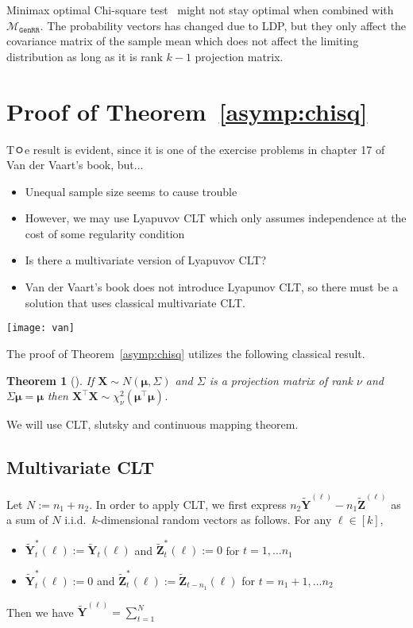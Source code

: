 \documentclass[11pt]{article} %
\newcommand{\vecBold}[1]{\boldsymbol{#1}} %
\newcommand{\alphabetSize}{k}
\newcommand{\genrr}{\mathcal{M}_{\texttt{GenRR}}}
\newcommand{\rvY}{Y}
\newcommand{\rVecY}{\vecBold{\rvY}}
\newcommand{\rvZ}{Z}
\newcommand{\rVecZ}{\vecBold{\rvZ}}
\newtheorem{theorem}{Theorem}[section]
\begin{document}
Minimax optimal Chi-square test~\citet{Arias-Castro2018RememberDimension} might not stay optimal when combined with $\genrr$.
The probability vectors has changed due to LDP, but they only affect the covariance matrix of the sample mean which does not affect the limiting distribution as long as it is rank $\alphabetSize-1$ projection matrix.

\section{Proof of Theorem~\ref{asymp:chisq} }

Tㅇe result is evident, since it is one of the exercise problems in chapter 17 of Van der Vaart's book, but...
\begin{itemize}
	\item Unequal sample size seems to cause trouble
	\item However, we may use Lyapuvov CLT which only assumes independence at the cost of some regularity condition
	\item Is there a multivariate version of Lyapuvov CLT?
	\item Van der Vaart's book does not introduce Lyapunov CLT, so there must be a solution that uses classical multivariate CLT. 
\end{itemize}
\begin{figure*}
	\texttt{[image: van]}
\end{figure*}
The proof of Theorem~\ref{asymp:chisq}  utilizes the following classical result.
\begin{theorem}[\citet{ferguson1996course}]
	If $\boldsymbol{X} \sim N(\boldsymbol{\mu}, \Sigma)$
	and
	$\Sigma$ is a projection matrix of rank $\nu$ and $\Sigma \boldsymbol{\mu} = \boldsymbol{\mu}$ then 
	$\boldsymbol{X}^\top \boldsymbol{X}  \sim \chi^2_\nu (\boldsymbol{\mu}^\top \boldsymbol{\mu})$.
\end{theorem}
We will use CLT, slutsky and continuous mapping theorem.
\subsection{Multivariate CLT}
Let $N:=n_1 + n_2$.
In order to apply CLT, 
we first express $n_2 \tilde{\rVecY}^{(\ell)} - n_1 \tilde{\rVecZ}^{(\ell)}$ as a sum of $N$ i.i.d.~$\alphabetSize$-dimensional random vectors as follows. For any $\ell \in [\alphabetSize]$,
\begin{itemize}
	\item $\tilde{\rVecY}_t^\ast(\ell) := \tilde{\rVecY}_t(\ell)$ and $\tilde{\rVecZ}_t^\ast(\ell) := 0$ for  $t=1,\ldots n_1$
	\item $\tilde{\rVecY}_t^\ast(\ell) := 0$ and $\tilde{\rVecZ}_t^\ast(\ell) := \tilde{\rVecZ}_{t-n_1}(\ell)$ for  $t=n_1+1,\ldots n_2$
\end{itemize}
Then we have $\tilde{\rVecY}^{(\ell)} = \sum_{t=1}^N$
		
\end{document}
